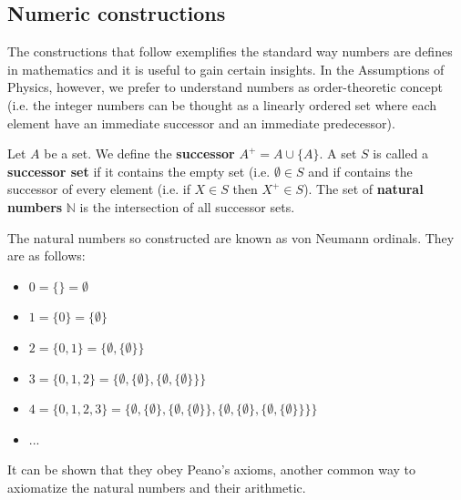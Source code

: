 \documentclass{article}
\newcommand{\marginleft}[1] {\reversemarginpar\marginpar{#1}}
\begin{document}

\subsection{Numeric constructions}
\begin{remark}
	The constructions that follow exemplifies the standard way numbers are defines in mathematics and it is useful to gain certain insights. In the Assumptions of Physics, however, we prefer to understand numbers as order-theoretic concept (i.e. the integer numbers can be thought as a linearly ordered set where each element have an immediate successor and an immediate predecessor).
\end{remark}
\begin{defn}\label{defn_successor_set}
	Let $A$ be a set. We define the \textbf{successor} $A^+ = A \cup \{A\}$. A set $S$ is called a \textbf{successor set} if it contains the empty set (i.e. $\emptyset \in S$ and if contains the successor of every element (i.e. if $X \in S$ then $X^+ \in S$). The set of \textbf{natural numbers} $\mathbb{N}$ is the intersection of all successor sets.
\end{defn}
\begin{remark}
	The natural numbers so constructed are known as von Neumann ordinals. They are as follows:
	\begin{itemize}
		\item $0 = \{ \} = \emptyset$
		\item $1 = \{ 0 \} = \{ \emptyset \}$
		\item $2 = \{0, 1\} = \{ \emptyset, \{ \emptyset\} \}$
		\item $3 = \{0, 1, 2\} = \{ \emptyset, \{ \emptyset\}, \{ \emptyset, \{ \emptyset\} \} \}$
		\item $4 = \{0, 1, 2, 3\} = \{ \emptyset, \{ \emptyset\}, \{ \emptyset, \{ \emptyset\} \}, \{ \emptyset, \{ \emptyset\}, \{ \emptyset, \{ \emptyset\} \} \} \}$
		\item ...
	\end{itemize}
	It can be shown that they obey Peano's axioms, another common way to axiomatize the natural numbers and their arithmetic.
\end{remark}
\end{document}
